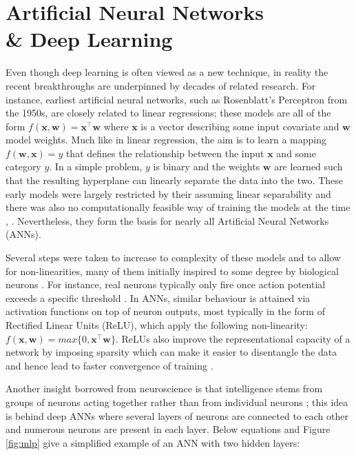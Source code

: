 \documentclass[12pt]{report}
\begin{document}
\section{Artificial Neural Networks \\ \& Deep Learning}
Even though deep learning is often viewed as a new technique, in reality the recent breakthroughs are underpinned by decades of related research. For instance, earliest artificial neural networks, such as Rosenblatt's Perceptron \cite{Rosenblatt1958} from the 1950s, are closely related to linear regressions; these models are all of the form $f(\mathbf{x}, \mathbf{w})=\mathbf{x}^{\intercal} \mathbf{w}$ where $\mathbf{x}$ is a vector describing some input covariate and $\mathbf{w}$ model weights. Much like in linear regression, the aim is to learn a mapping $f(\mathbf{w}, \mathbf{x}) = y$ that defines the relationship between the input $\mathbf{x}$ and some category $y$. In a simple problem, $y$ is binary and the weights $\mathbf{w}$ are learned such that the resulting hyperplane can linearly separate the data into the two. These early models were largely restricted by their assuming linear separability and there was also no computationally feasible way of training the models at the time \cite{Goodfellow2016}, \cite{JurgenSchmidhuber2015}. Nevertheless, they form the basis for nearly all Artificial Neural Networks (ANNs). 

Several steps were taken to increase to complexity of these models and to allow for non-linearities, many of them initially inspired to some degree by biological neurons \cite{Goodfellow16}. For instance, real neurons typically only fire once action potential exceeds a specific threshold \cite{Hodgkin1990}. In ANNs, similar behaviour is attained via activation functions on top of neuron outputs, most typically in the form of Rectified Linear Units (ReLU), which apply the following non-linearity: $f(\mathbf{x}, \mathbf{w})=max\{0, \mathbf{x}^{\intercal} \mathbf{w}\}$. ReLUs also improve the representational capacity of a network by imposing sparsity which can make it easier to disentangle the data \cite{Glorot2011} and hence lead to faster convergence of training \cite{Krizhevsky2012}.

Another insight borrowed from neuroscience is that intelligence stems from groups of neurons acting together rather than from individual neurons \cite{Goodfellow2016}; this idea is behind deep ANNs where several layers of neurons are connected to each other and numerous neurons are present in each layer. Below equations and Figure \ref{fig:mlp} give a simplified example of an ANN with two hidden layers:
\end{document}

